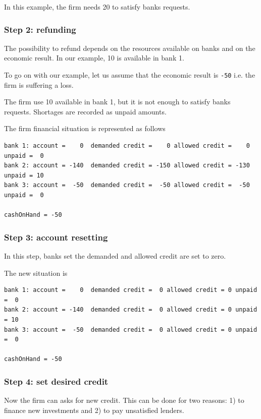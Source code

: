 \documentclass{article}
\begin{document}
In this example, the firm needs 20 to satisfy banks requests.

\subsubsection*{Step 2: refunding}

The possibility to refund depends on the resources available on banks and on the economic result. In our example, 10 is available in bank 1.

To go on with our example, let us assume that the economic result is \verb+-50+ i.e. the firm is suffering a loss.

The firm use 10 available in bank 1, but it is not enough to satisfy banks requests. Shortages are recorded as unpaid amounts.

The firm financial situation is represented as follows

\begin{verbatim}
bank 1: account =    0  demanded credit =    0 allowed credit =    0 unpaid =  0
bank 2: account = -140  demanded credit = -150 allowed credit = -130 unpaid = 10
bank 3: account =  -50  demanded credit =  -50 allowed credit =  -50 unpaid =  0

cashOnHand = -50
\end{verbatim}

\subsubsection*{Step 3: account resetting}
In this step, banks set the demanded and allowed credit are set to zero.

The new situation is

\begin{verbatim}
bank 1: account =    0  demanded credit =  0 allowed credit = 0 unpaid =  0
bank 2: account = -140  demanded credit =  0 allowed credit = 0 unpaid = 10
bank 3: account =  -50  demanded credit =  0 allowed credit = 0 unpaid =  0

cashOnHand = -50
\end{verbatim}



\subsubsection*{Step 4: set desired credit}

Now the firm can asks for new credit. This can be done for two reasons: 1) to finance new investments and 2) to pay unsatisfied lenders.
\end{document}
